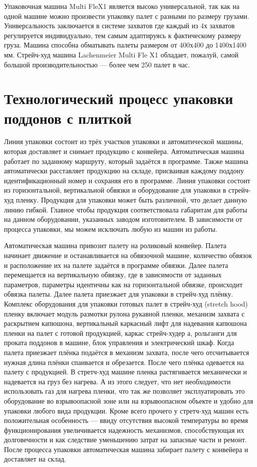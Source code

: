 Упаковочная машина Multi FleX1 является высоко универсальной, так как на одной машине можно произвести упаковку палет с разными по размеру грузами. Универсальность заключается в системе захватов где каждый из 4х захватов регулируется индивидуально, тем самым адаптируясь к фактическому размеру груза. Машина способна обматывать палеты размером от 400х400 до 1400х1400 мм. Стрейч-худ машина Lachenmeier Multi Fle X1 обладает, пожалуй, самой большой производительностью --- более чем 250 палет в час.

\section{Технологический процесс упаковки поддонов с плиткой}

Линия упаковки состоит из трёх участков упаковки и автоматической машины, которая доставляет и снимает продукцию с конвейера. Автоматическая машина работает по заданному маршруту, который задаётся в программе. Также машина автоматически расставляет продукцию на складе, присваивая каждому поддону идентификационный номер и сохраняя его в программе. Линия упаковки состоит из горизонтальной, вертикальной обвязки и оборудование для упаковки в стрейч-худ пленку. Продукция для упаковки может быть различной, что делает данную линию гибкой. Главное чтобы продукция соответствовала габаритам для работы на данном оборудовании, указанных заводом изготовителем. В зависимости от процесса упаковки, мы можем исключать любую из машин из работы.

Автоматическая машина привозит палету на роликовый конвейер. Палета начинает движение и останавливается на обвязочной машине, количество обвязок и расположение их на палете задаётся в программе обвязки. Далее палета перемещается на вертикальную обвязку, где в зависимости от заданных параметров, параметры идентичны как на горизонтальной обвязке, происходит обвязка палеты. Далее палета приезжает для упаковки в стрейч-худ плёнку. Комплекс оборудования для упаковки готовых палет в стрейч-худ (stretch hood) пленку включает модуль размотки рулона рукавной пленки, механизм захвата с раскрытием капюшона, вертикальный каркасный лифт для надевания капюшона пленки на палет с готовой продукцией, каркас стрейч-худер а, рольганги для проката поддонов в машине, блок управления и электрический шкаф. Когда палета приезжает плёнка подаётся в механизм захвата, после чего отсчитывается нужная длина плёнки спаивается и обрезается. После чего плёнка одевается на палету с продукцией. В стретч-худ машине пленка растягивается механически и надевается на груз без нагрева. А из этого следует, что нет необходимости использовать газ для нагрева пленки, что так же позволяет эксплуатировать это оборудование во взрывоопасной зоне или на взрывоопасном объекте и удобно для упаковки любого вида продукции. Кроме всего прочего у стретч-худ машин есть положительная особенность --- ввиду отсутствия высокой температуры во время функционирования увеличивается надежность механизмов, способствующая их долговечности и как следствие уменьшению затрат на запасные части и ремонт. После процесса упаковки автоматическая машина забирает палету с конвейера и доставляет на склад.

